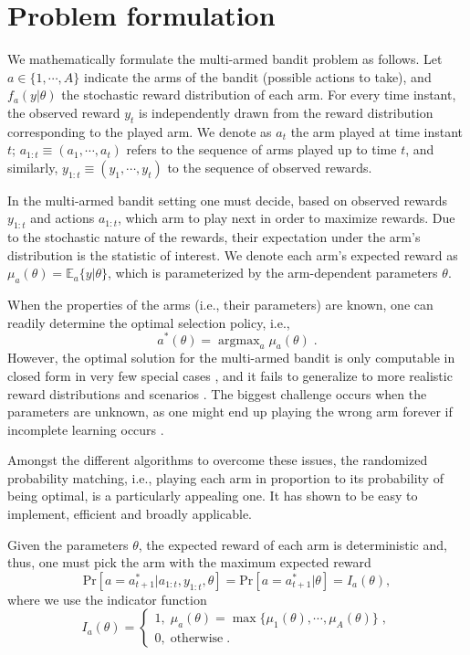 \documentclass{article}
\newcommand{\ie}{i.e., }
\newcommand{\argmax}{\mathop{\mathrm{argmax}}}
\begin{document}
\section{Problem formulation}
\label{sec:problem_formulation}

We mathematically formulate the multi-armed bandit problem as follows. Let $a\in\{1,\cdots,A\}$ indicate the arms of the bandit (possible actions to take), and $f_{a}(y|\theta)$ the stochastic reward distribution of each arm. For every time instant, the observed reward $y_t$ is independently drawn from the reward distribution corresponding to the played arm. We denote as $a_t$ the arm played at time instant $t$; $a_{1:t} \equiv (a_1, \cdots , a_t)$ refers to the sequence of arms played up to time $t$, and similarly, $y_{1:t} \equiv (y_1, \cdots , y_t)$ to the sequence of observed rewards.

In the multi-armed bandit setting one must decide, based on observed rewards $y_{1:t}$ and actions $a_{1:t}$, which arm to play next in order to maximize rewards. Due to the stochastic nature of the rewards, their expectation under the arm's distribution is the statistic of interest. We denote each arm's expected reward as $\mu_{a}(\theta)=\mathbb{E}_{a}\{y|\theta\}$, which is parameterized by the arm-dependent parameters $\theta$.

When the properties of the arms (\ie their parameters) are known, one can readily determine the optimal selection policy, \ie
	\begin{equation}
	a^*(\theta)=\argmax_{a}\mu_{a}(\theta) \; .
	\end{equation}
However, the optimal solution for the multi-armed bandit is only computable in closed form in very few special cases \cite{j-Bellm1956, j-Gittins1979}, and it fails to generalize to more realistic reward distributions and scenarios \cite{j-Scott2010}. The biggest challenge occurs when the parameters are unknown, as one might end up playing the wrong arm forever if incomplete learning occurs \cite{j-Brezzi2000}. 

Amongst the different algorithms to overcome these issues, the randomized probability matching, \ie playing each arm in proportion to its probability of being optimal, is a particularly appealing one. It has shown to be easy to implement, efficient and broadly applicable.

Given the parameters $\theta$, the expected reward of each arm is deterministic and, thus, one must pick the arm with the maximum expected reward
\begin{equation}
\mathrm{Pr}\left[a=a_{t+1}^*|a_{1:t}, y_{1:t}, \theta \right] = \mathrm{Pr}\left[a=a_{t+1}^*|\theta \right] = I_a(\theta),
\label{eq:theta_known_pr_arm_optimal}
\end{equation}
where we use the indicator function
\begin{equation}
I_a(\theta) = \begin{cases}
1, \; \mu_{a}(\theta)=\max\{\mu_1(\theta), \cdots, \mu_A(\theta)\} \;, \\
0, \; \text{otherwise} \;.
\end{cases}
\label{eq:indicator_arm_optimal}
\end{equation}
\end{document}
